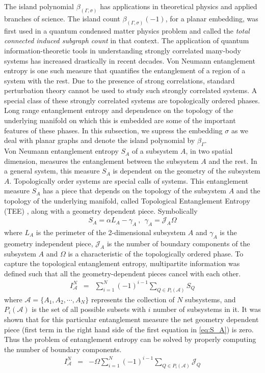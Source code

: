 \documentclass[10pt, reqno]{amsart}
\newcommand{\hf}{\hspace*{0.5cm}}
\theoremstyle{plain}
\theoremstyle{remark}
\theoremstyle{definition}
\numberwithin{equation}{section}
\begin{document}
\hf The island polynomial $\beta_{(\Gamma,\sigma)}$ has applications in theoretical physics and applied branches of science. The island count $\beta_{(\Gamma,\sigma)}(-1)$, for a planar embedding, was first used in a quantum condensed matter physics problem and called the {\it total connected induced subgraph count} in that context. The application of quantum information-theoretic tools in understanding strongly correlated many-body systems has increased drastically in recent decades. Von Neumann entanglement entropy is one such measure that quantifies the entanglement of a region of a system with the rest. Due to the presence of strong correlations, standard perturbation theory cannot be used to study such strongly correlated systems. A special class of these strongly correlated systems are topologically ordered phases. Long range entanglement entropy and dependence on the topology of the underlying manifold on which this is embedded are some of the important features of these phases. In this subsection, we supress the embedding $\sigma$ as we deal with planar graphs and denote the island polynomial by $\beta_{\Gamma}$. \\
\hf Von Neumann entanglement entropy $S_A$ of a subsystem $A$, in two spatial dimension, measures the entanglement between the subsystem $A$ and the rest. In a general system, this measure $S_A$ is dependent on the geometry of the subsystem $A$. Topologically order systems are special calls of systems. This entanglement measure $S_A$ has a piece that depends on the topology of the subsystem $A$ and the topology of the underlying manifold, called Topological Entanglement Entropy (TEE) \cite{Kitaev_Preskill_2006,Levin_Wen_2006,SiddharthaTEE2021}, along with a geometry dependent piece. Symbolically
\begin{eqnarray}
S_A=\alpha L_A -\gamma_A~,~~\gamma_A=\mathcal{J}_A \Omega
\label{eq:S_A}
\end{eqnarray}
where $L_A$ is the perimeter of the 2-dimensional subsystem $A$ and $\gamma_A$ is the geometry independent piece, $\mathcal{J}_A$ is the number of boundary components of the subsystem $A$ and $\Omega$ is a characteristic of the topologically ordered phase. To capture the topological entanglement entropy, multipartite information was defined such that all the geometry-dependent pieces cancel with each other. 
\begin{eqnarray*}
I^N_\mathcal{A} &=& \sum_{i=1}^{N} (-1)^{i-1} \sum_{Q\in P_i(\mathcal{A}) } S_{Q}
\end{eqnarray*}
where $\mathcal{A}=\{A_1,A_2,\cdots,A_N\}$ represents the collection of $N$ subsystems, and $P_i(\mathcal{A})$ is the set of all possible subsets with $i$ number of subsystems in it. It was shown that for this particular entanglement measure the net geometry dependent piece (first term in the right hand side of the first equation in \eqref{eq:S_A}) is zero. Thus the problem of entanglement entropy can be solved by properly computing the number of boundary components.
\begin{eqnarray*}
I^N_{\mathcal{A}} &=& -\Omega \sum_{i=1}^{N} (-1)^{i-1} \sum_{Q\in P_i(\mathcal{A}) } \mathcal{J}_{Q}
\end{eqnarray*}
\end{document}
